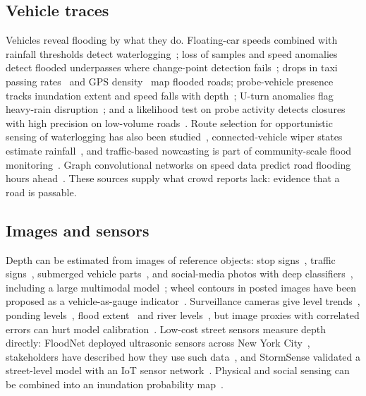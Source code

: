 \documentclass[journal]{IEEEtran}
\begin{document}
\subsection{Vehicle traces}
Vehicles reveal flooding by what they do. Floating-car speeds combined with rainfall thresholds detect waterlogging~\cite{hu2018fcd}; loss of samples and speed anomalies detect flooded underpasses where change-point detection fails~\cite{song2015bridges}; drops in taxi passing rates~\cite{kong2022taxi} and GPS density~\cite{she2019gps} map flooded roads; probe-vehicle presence tracks inundation extent and speed falls with depth~\cite{hiramoto2025probe}; U-turn anomalies flag heavy-rain disruption~\cite{kawasaki2024uturn}; and a likelihood test on probe activity detects closures with high precision on low-volume roads~\cite{pietrobon2019closure}. Route selection for opportunistic sensing of waterlogging has also been studied~\cite{wang2024opportunity}, connected-vehicle wiper states estimate rainfall~\cite{bartos2019wipers}, and traffic-based nowcasting is part of community-scale flood monitoring~\cite{yuan2022smart}. Graph convolutional networks on speed data predict road flooding hours ahead~\cite{yuan2022stgcn}. These sources supply what crowd reports lack: evidence that a road is passable.

\subsection{Images and sensors}
Depth can be estimated from images of reference objects: stop signs~\cite{kharazi2021stopsign,alizadeh2023signage}, traffic signs~\cite{song2021floodmask}, submerged vehicle parts~\cite{zhong2024traffic}, and social-media photos with deep classifiers~\cite{wu2024cbam,du2025caresnet}, including a large multimodal model~\cite{akinboyewa2024gpt4v}; wheel contours in posted images have been proposed as a vehicle-as-gauge indicator~\cite{yang2026vfg}. Surveillance cameras give level trends~\cite{moydevitry2019sofi}, ponding levels~\cite{hao2022ponding}, flood extent~\cite{wang2024cctvseg} and river levels~\cite{vandaele2021river}, but image proxies with correlated errors can hurt model calibration~\cite{moydevitry2020proxy}. Low-cost street sensors measure depth directly: FloodNet deployed ultrasonic sensors across New York City~\cite{mydlarz2024floodnet}, stakeholders have described how they use such data~\cite{silverman2022waves}, and StormSense validated a street-level model with an IoT sensor network~\cite{loftis2018stormsense}. Physical and social sensing can be combined into an inundation probability map~\cite{du2024ips}.
\end{document}
